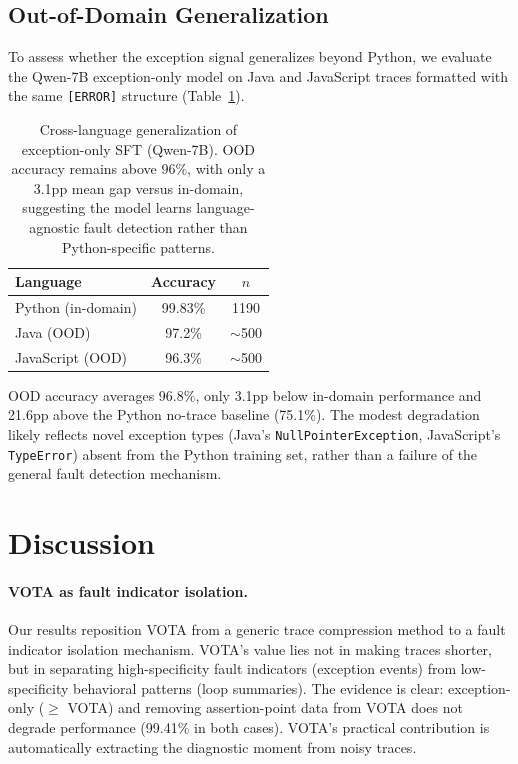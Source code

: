 \documentclass[11pt,a4paper]{article}
\begin{document}
\subsection{Out-of-Domain Generalization}

To assess whether the exception signal generalizes beyond Python, we evaluate the Qwen-7B exception-only model on Java and JavaScript traces formatted with the same \texttt{[ERROR]} structure (Table~\ref{tab:ood}).

\begin{table}[t]
\centering
\small
\begin{tabular}{lcc}
\toprule
\textbf{Language} & \textbf{Accuracy} & \textbf{$n$} \\
\midrule
Python (in-domain) & 99.83\% & 1190 \\
Java (OOD) & 97.2\% & $\sim$500 \\
JavaScript (OOD) & 96.3\% & $\sim$500 \\
\bottomrule
\end{tabular}
\caption{Cross-language generalization of exception-only SFT (Qwen-7B). OOD accuracy remains above 96\%, with only a 3.1pp mean gap versus in-domain, suggesting the model learns language-agnostic fault detection rather than Python-specific patterns.}
\label{tab:ood}
\end{table}

OOD accuracy averages 96.8\%, only 3.1pp below in-domain performance and 21.6pp above the Python no-trace baseline (75.1\%). The modest degradation likely reflects novel exception types (Java's \texttt{NullPointerException}, JavaScript's \texttt{TypeError}) absent from the Python training set, rather than a failure of the general fault detection mechanism.

\section{Discussion}

\paragraph{VOTA as fault indicator isolation.}
Our results reposition VOTA from a generic trace compression method to a fault indicator isolation mechanism. VOTA's value lies not in making traces shorter, but in separating high-specificity fault indicators (exception events) from low-specificity behavioral patterns (loop summaries). The evidence is clear: exception-only ($\geq$ VOTA) and removing assertion-point data from VOTA does not degrade performance (99.41\% in both cases). VOTA's practical contribution is automatically extracting the diagnostic moment from noisy traces.
\end{document}
